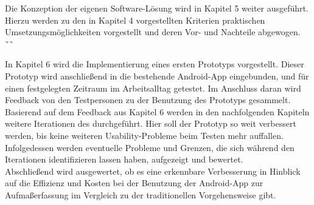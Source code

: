 Die Konzeption der eigenen Software-Lösung wird in Kapitel 5 weiter ausgeführt.
Hierzu werden zu den in Kapitel 4 vorgestellten Kriterien praktischen Umsetzungsmöglichkeiten vorgestellt und deren Vor- und Nachteile abgewogen. ˜˜

In Kapitel 6 wird die Implementierung eines ersten Prototyps vorgestellt.
Dieser Prototyp wird anschließend in die bestehende Android-App eingebunden, und für einen festgelegten Zeitraum im Arbeitsalltag getestet.
Im Anschluss daran wird Feedback von den Testpersonen zu der Benutzung des Prototyps gesammelt. \\

Basierend auf dem Feedback aus Kapitel 6 werden in den nachfolgenden Kapiteln weitere Iterationen des \hcdp{} durchgeführt.
Hier soll der Prototyp so weit verbessert werden, bis keine weiteren Usability-Probleme beim Testen mehr auffallen. \\

Infolgedessen werden eventuelle Probleme und Grenzen, die sich während den Iterationen identifizieren lassen haben, aufgezeigt und bewertet. \\

Abschließend wird ausgewertet, ob es eine erkennbare Verbesserung in Hinblick auf die Effizienz und Kosten bei der Benutzung der Android-App zur Aufmaßerfassung im Vergleich zu der traditionellen Vorgehensweise gibt.
